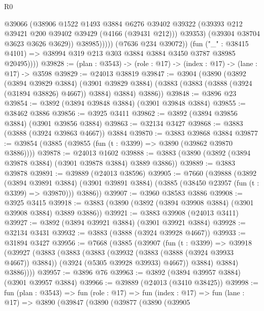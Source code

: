 \begin{lexlean}{R0}
\begin{coremodule}
                        @39066
                        (@38906
                          @1522
                          @1493
                          @3884
                          @6276
                          @39402
                          @39322
                          (@39393 @212 @39421 @200 @39402 @39429 (@4166 (@39431 @212)))
                          @39353)
                        (@39304 @38704 @3623 @3626 @3629))
                      @38985)))))
            (@7636 @234 @39072))
          (fun ("_" : @38415 @4101) =>
          @38994 @319 @213 @303 @3884 @3884 @3450 @3787 @38985 @20495))))
@39828 := (plan : @3543) -> (role : @17) -> (index : @17) -> (lane : @17) -> @3598
@39829 := @24013 @38819
@39847 := @3904
    (@3890
      (@3892
        (@3894 @39829 @3884)
        (@3901 @39829 @3884)
        (@3883 (@3883 (@3888 (@3924 (@31894 @38826) @4667)) @3884) @3884)
        @3886))
@39848 := @3896 @23
@39854 := @3892 (@3894 @39848 @3884) (@3901 @39848 @3884)
@39855 := @38462 @3886
@39856 := @3925 @3411
@39862 := @3892 (@3894 @39856 @3884) (@3901 @39856 @3884)
@39863 := @32134 @3427
@39868 := @3883 (@3888 (@3924 @39863 @4667)) @3884
@39870 := @3883 @39868 @3884
@39877 := @39854 (@3885 (@39855 (fun (t : @3399) => @3890 (@39862 @39870 @3886))))
@39878 := @24013 @1602
@39888 := @3883 (@3890 (@3892 (@3894 @39878 @3884) (@3901 @39878 @3884) @3889 @3886))
@39889 := @3883 @39878
@39891 := @39889 (@24013 @38596)
@39905 := @7660
    (@39888
      (@3892
        (@3894 @39891 @3884)
        (@3901 @39891 @3884)
        (@3885 (@38450 @23957 (fun (t : @3399) => @39870)))
        @3886))
@39907 := @3960 @38583 @3886
@39908 := @3925 @3415
@39918 := @3883 (@3890 (@3892 (@3894 @39908 @3884) (@3901 @39908 @3884) @3889 @3886))
@39921 := @3883 @39908 (@24013 @3411)
@39927 := @3892 (@3894 @39921 @3884) (@3901 @39921 @3884)
@39928 := @32134 @3431
@39932 := @3883 (@3888 (@3924 @39928 @4667))
@39933 := @31894 @3427
@39956 := @7668
    (@3885
      (@39907
        (fun (t : @3399) =>
        @39918
          (@39927
            (@3883
              (@3883
                (@3883
                  (@39932 (@3883 (@3888 (@3924 @39933 @4667)) @3884))
                  (@3924 (@5305 @39928 @39933) @4667))
                @3884)
              @3884)
            @3886))))
@39957 := @3896 @76
@39963 := @3892 (@3894 @39957 @3884) (@3901 @39957 @3884)
@39966 := @39889 (@24013 (@3410 @38425))
@39998 := fun (plan : @3543) =>
  fun (role : @17) =>
  fun (index : @17) =>
  fun (lane : @17) =>
  @3890
    (@39847
      (@3890
        (@39877
          (@3890
            (@39905

\end{coremodule}
\end{lexlean}
